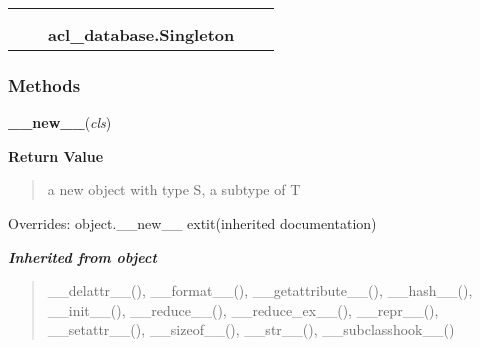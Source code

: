     \label{acl_database:Singleton}
\begin{tabular}{cccccc}
\multicolumn{2}{r}{\settowidth{\BCL}{object}\multirow{2}{\BCL}{object}}
&&
  \\\cline{3-3}
  &&\multicolumn{1}{c|}{}
&&
  \\
&&\multicolumn{2}{l}{\textbf{acl\_database.Singleton}}
\end{tabular}



  \subsubsection{Methods}

    \vspace{0.5ex}

\hspace{.8\funcindent}\begin{boxedminipage}{\funcwidth}

    \raggedright \textbf{\_\_new\_\_}(\textit{cls})

\setlength{\parskip}{2ex}
\setlength{\parskip}{1ex}
      \textbf{Return Value}
    \vspace{-1ex}

      \begin{quote}
      a new object with type S, a subtype of T

      \end{quote}

      Overrides: object.\_\_new\_\_ 	extit{(inherited documentation)}

    \end{boxedminipage}


\large{\textbf{\textit{Inherited from object}}}

\begin{quote}
\_\_delattr\_\_(), \_\_format\_\_(), \_\_getattribute\_\_(), \_\_hash\_\_(), \_\_init\_\_(), \_\_reduce\_\_(), \_\_reduce\_ex\_\_(), \_\_repr\_\_(), \_\_setattr\_\_(), \_\_sizeof\_\_(), \_\_str\_\_(), \_\_subclasshook\_\_()
\end{quote}


